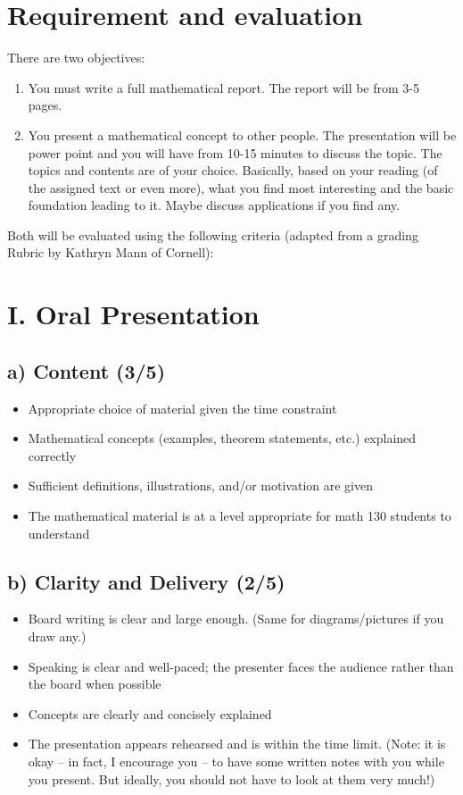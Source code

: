 \documentclass[12pt]{amsart}
\begin{document}
\section{Requirement and evaluation}
There are two objectives:
\begin{enumerate}
	\item You must write a full mathematical report. The report will be from 3-5 pages.
	\item You present a mathematical concept to other people. The presentation will be power point and you will have from 10-15 minutes to discuss the topic.
	      The topics and contents are of your choice.
	      Basically, based on your reading (of the assigned text or even more), what you find most interesting and the basic foundation leading to it. Maybe discuss applications if you find any.
\end{enumerate}
Both will be evaluated using the following criteria (adapted from a grading Rubric
by Kathryn Mann of Cornell):

\section*{I. Oral Presentation}

\subsection*{a) Content (3/5)}
\begin{itemize}
	\item Appropriate choice of material given the time constraint
	\item Mathematical concepts (examples, theorem statements, etc.) explained correctly
	\item Sufficient definitions, illustrations, and/or motivation are given
	\item The mathematical material is at a level appropriate for math 130 students to understand
\end{itemize}

\subsection*{b) Clarity and Delivery (2/5)}
\begin{itemize}
	\item Board writing is clear and large enough. (Same for diagrams/pictures if you draw any.)
	\item Speaking is clear and well-paced; the presenter faces the audience rather than the board when possible
	\item Concepts are clearly and concisely explained
	\item The presentation appears rehearsed and is within the time limit. (Note: it is okay – in fact, I encourage you – to have some written notes with you while you present. But ideally, you should not have to look at them very much!)
\end{itemize}
\end{document}
